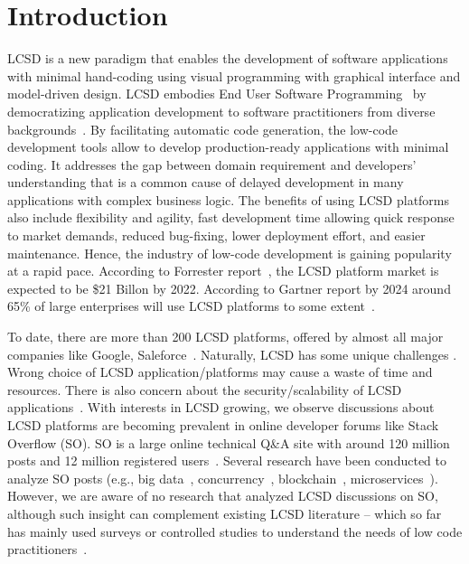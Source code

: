 \section{Introduction}
LCSD is a new paradigm that enables the development of
software applications with minimal hand-coding using visual programming with
graphical interface and model-driven design. LCSD embodies End User Software Programming~\cite{Pane-MoreNatureEUSE-Springer2006} by 
democratizing application development to software practitioners from diverse backgrounds~\cite{di2020democratizing}.  
By facilitating automatic code
generation, the low-code development tools allow to develop production-ready applications with minimal coding. It
addresses the gap between domain requirement and developers' understanding that
is a common cause of delayed development in many applications with complex
business logic. The benefits of using  LCSD platforms
also include flexibility and agility, fast development time allowing
quick response to market demands, reduced bug-fixing, lower deployment effort,
and easier maintenance. Hence, the industry of low-code development is gaining
popularity at a rapid pace. According to Forrester
report~\cite{rymer2019forrester}, the  LCSD platform market is expected to be \$21 Billon by
2022. According to Gartner report by 2024 around 65\% of
large enterprises will use  LCSD platforms to some extent~\cite{wong2019low}.

To date, there are more than 200  LCSD platforms, offered by almost all major companies like Google, Saleforce~\cite{vincent2019magic}. 
Naturally,  LCSD has some unique challenges
\cite{sahay2020supporting}. Wrong
choice of  LCSD application/platforms may cause a waste of
time and resources. There is also concern about the security/scalability of
 LCSD applications~\cite{lowcodetesting}. With interests in  LCSD growing, we observe discussions about  LCSD platforms are becoming prevalent in online developer forums like Stack Overflow (SO). SO is a large online technical Q\&A site with
around 120 million posts and 12 million registered users~\cite{website:stackoverflow}. Several research have been conducted to
analyze SO posts (e.g., big
data~\cite{Bagherzadeh2019}, concurrency~\cite{Ahmed-ConcurrencyTopic-ESEM2018}, blockchain~\cite{wan2019discussed}, microservices~\cite{bandeira2019we}). However, we are aware of no
research that analyzed  LCSD discussions on SO, 
although such insight can complement existing  LCSD literature -- which so far has mainly used surveys or controlled studies to understand the needs of low code practitioners~\cite{lowcodeapp,kourouklidis2020towards,alonso2020towards,lowcodetesting}.  

